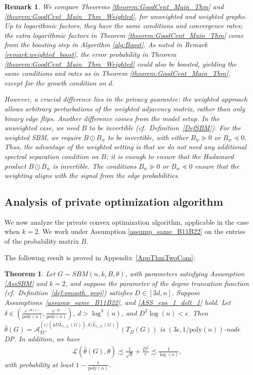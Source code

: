 \documentclass{article}
\newtheorem{remark}{Remark}
\newtheorem{theorem}{Theorem}
\newcommand{\thetahat}{\ensuremath{\widehat{\theta}}}
\begin{document}
\begin{remark}
We compare Theorems \ref{theorem:GoodCent_Main_Thm} and \ref{theorem:GoodCent_Main_Thm_Weighted}, for unweighted and weighted graphs. Up to logarithmic factors, they have the same conditions and convergence rates; the extra logarithmic factors in Theorem \ref{theorem:GoodCent_Main_Thm} come from the boosting step in Algorithm \ref{alg:Boost}. As noted in Remark \ref{remark:weighted_boost}, the error probability in Theorem \ref{theorem:GoodCent_Main_Thm_Weighted} could also be boosted, yielding the same conditions and rates as in Theorem \ref{theorem:GoodCent_Main_Thm}, except for the growth condition on $d$.

However, a crucial difference lies in the privacy guarantee: the weighted approach allows arbitrary perturbations of the weighted adjacency matrix, rather than only binary edge flips. Another difference comes from the model setup. In the unweighted case, we need $B$ to be invertible (cf.\ Definition~\ref{DefSBM}). For the weighted SBM, we require $B \odot B_w$ to be invertible, with either $B_w \succeq 0$ or $B_w \preceq 0$. Thus, the advantage of the weighted setting is that we do not need any additional spectral separation condition on $B$; it is enough to ensure that the Hadamard product $B \odot B_w$ is invertible. The conditions $B_w \succeq 0$ or $B_w \preceq 0$ ensure that the weighting aligns with the signal from the edge probabilities. 
\end{remark}


\subsection{Analysis of private optimization algorithm}
\label{section:Two-community Algorithm}

We now analyze the private convex optimization algorithm, applicable in the case when $k = 2$. We work under Assumption \ref{assump_same_B11B22} on the entries of the probability matrix $B$.

The following result is proved in Appendix~\ref{AppThmTwoCom}:

\begin{theorem}
\label{theorem:Two_Comm_Main_Thm}
Let $G \sim SBM(n, k, B, \theta)$, with parameters satisfying Assumption \ref{AssSBM} and $k=2$, and suppose the parameter of the degree truncation function (cf.\ Definition~\ref{def:smooth_proj}) satisfies $D \in [3d, n]$. Suppose Assumptions~\ref{assump_same_B11B22}, and \ref{ASS_eps_1_delt_1} hold. Let $\delta \in \left(\frac{e^{-\Theta(\epsilon)}}{\mathrm{poly}(n)}, \frac{e^{-2\epsilon}}{\mathrm{poly}(n)}\right)$, $d > \log^3(n)$, and $D^2\log(n) < \epsilon$. Then $\thetahat(G) = \mathcal{A}_{TC}^{(\epsilon/(4D\hat{L}_{\epsilon_1, \delta_1}(G)), \delta/\hat{L}_{\epsilon_1, \delta_1}(G))}(T_{D}(G))$ is $(3\epsilon, 1/\mathrm{poly}(n))$-node DP. In addition, we have 
\begin{align*}
\mathcal{L}\left(\thetahat(G), \theta\right) \precsim \frac{1}{\sqrt{d}} + \frac{D^2}{\epsilon} \precsim \frac{1}{\log(n)},
\end{align*}
with probability at least $1 - \frac{1}{\mathrm{poly}(n)}$.   
\end{theorem}
\end{document}

